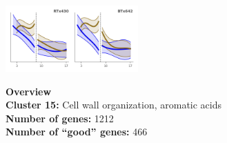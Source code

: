 \begin{multicols}{2}
\includegraphics[width=2in]{figures/clusters/leaf_Preflowering_14.png}
\columnbreak

\noindent \textbf{Overview}\\\textbf{Cluster 15:} Cell wall organization, aromatic acids \\
\textbf{Number of genes:} 1212 \\
\textbf{Number of ``good'' genes:} 466 \\
\end{multicols}

